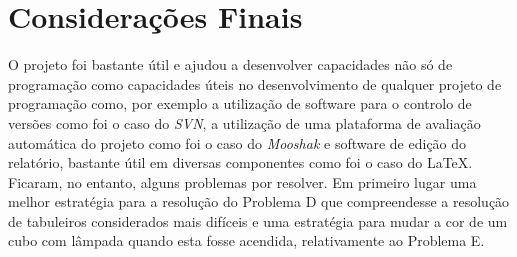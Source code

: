 \documentclass[a4paper,12pt,portuges]{article}
\begin{document}
\section {Considerações Finais}

O projeto foi bastante útil e ajudou a desenvolver capacidades não só de programação como capacidades úteis no desenvolvimento de qualquer projeto de programação como, por exemplo a utilização de software para o controlo de versões como foi o caso do \textit{SVN}, a utilização de uma plataforma de avaliação automática do projeto como foi o caso do \textit{Mooshak} e software de edição do relatório, bastante útil em diversas componentes como foi o caso do \LaTeX.
Ficaram, no entanto, alguns problemas por resolver. Em primeiro lugar uma melhor estratégia para a resolução do Problema D que compreendesse a resolução de tabuleiros considerados mais difíceis e uma estratégia para mudar a cor de um cubo com lâmpada quando esta fosse acendida, relativamente ao Problema E.
\end{document}
